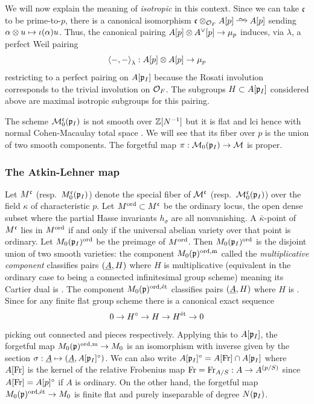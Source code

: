 \documentclass[main.tex]{subfiles}
\begin{document}
{We will now explain the meaning of \textit{isotropic} in this context. Since we can take $\mathfrak{c}$ to be prime-to-$p$, there is a canonical isomorphism $\cc \ot_{\cO_F} A[p] \iso A[p]$ sending $\alpha \otimes u \mapsto \iota(\alpha) u$. Thus, the canonical pairing $A[p] \otimes A^{\vee}[p] \to \mu_p$ induces, via $\lambda$, a perfect Weil pairing
\[ \left< -, - \right>_{\lambda} : A[p] \otimes A[p] \to \mu_p \]
restricting to a perfect pairing on $A[\mathfrak{p}_I]$ because the Rosati involution corresponds to the trivial involution on $\mathcal{O}_F$. The subgroups $H \subset A[\mathfrak{p}_I]$ considered above are maximal isotropic subgroups for this pairing. 
\par 
The scheme $\mathcal{M}_0^{\mathfrak{c}}(\mathfrak{p}_I)$ is not smooth over $\mathbb{Z}[N^{-1}]$ but it is flat and lci hence with normal Cohen-Macaulay total space \cite[Theorem 2.2.2 and Corollary 2.2.3]{pappas:arithmetic}. We will see that its fiber over $p$ is the union of two smooth components. The forgetful map $\pi : \mathcal{M}_0(\mathfrak{p}_I) \to \mathcal{M}$ is proper. 

\subsubsection{The Atkin-Lehner map}

Let $M^{\mathfrak{c}}$ (resp.\ $M_0^{\mathfrak{c}}(\mathfrak{p}_I)$) denote the special fiber of $\mathcal{M}^{\mathfrak{c}}$ (resp.\ $\mathcal{M}^{\mathfrak{c}}_0(\mathfrak{p}_I)$) over the field $\kappa$ of characteristic $p$. Let $M^{\operatorname{\mathrm{ord}}} \subset M^{\mathfrak{c}}$ be the ordinary locus, the open dense subset where the partial Hasse invariants $h_{\sigma}$ are all nonvanishing. A $\bar{\kappa}$-point of $M^{\mathfrak{c}}$ lies in $M^{\operatorname{\mathrm{ord}}}$ if and only if the universal abelian variety over that point is ordinary. Let $M_0(\mathfrak{p}_I)^{\operatorname{\mathrm{ord}}}$ be the preimage of $M^{\operatorname{\mathrm{ord}}}$. Then $M_0(\mathfrak{p}_I)^{\operatorname{\mathrm{ord}}}$ is the disjoint union of two smooth varieties: the component $M_0(\mathfrak{p})^{\operatorname{\mathrm{ord}},\mathrm{m}}$ called the \textit{multiplicative component} classifies pairs $(\underline{A}, H)$ where $H$ is multiplicative (equivalent in the ordinary case to being a connected infinitesimal group scheme) meaning its Cartier dual is \etale. The component $M_0(\mathfrak{p})^{\operatorname{\mathrm{ord}},\mathrm{\acute{e}t}}$ classifies pairs $(\underline{A}, H)$ where $H$ is \etale. Since for any finite flat group scheme there is a canonical exact sequence
\[ 0 \to H^{\circ} \to H \to H^{\mathrm{\acute{e}t}} \to 0 \]
picking out connected and \etale pieces respectively. Applying this to $A[\mathfrak{p}_I]$, the forgetful map $M_0(\mathfrak{p})^{\operatorname{\mathrm{ord}},\mathrm{m}} \to M_0$ is an isomorphism with inverse given by the section $\sigma : \underline{A} \mapsto (\underline{A}, A[\mathfrak{p}_I]^{\circ})$. We can also write $A[\mathfrak{p}_I]^{\circ} = A[\operatorname{\mathrm{Fr}}] \cap A[\mathfrak{p}_I]$ where $A[\operatorname{\mathrm{Fr}}]$ is the kernel of the relative Frobenius map $\operatorname{\mathrm{Fr}} = \operatorname{\mathrm{Fr}}_{A/S} : A \to A^{(p/S)}$ since $A[\operatorname{\mathrm{Fr}}] = A[p]^{\circ}$ if $A$ is ordinary. On the other hand, the forgetful map $M_0(\mathfrak{p})^{\operatorname{\mathrm{ord}},\mathrm{\acute{e}t}} \to M_0$ is finite flat and purely inseparable of degree $N(\mathfrak{p}_I)$. 

}
\end{document}
